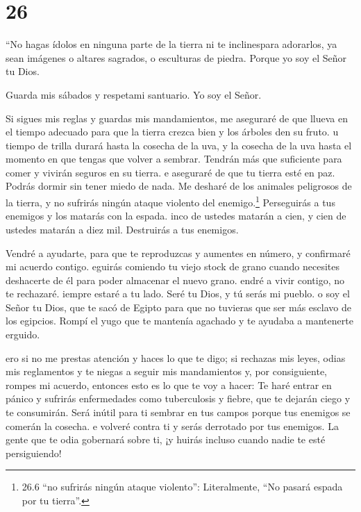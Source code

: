\hypertarget{section-25}{%
\section{26}\label{section-25}}

 ``No hagas ídolos en ninguna parte de la tierra ni te
inclinespara adorarlos, ya sean imágenes o altares sagrados, o
esculturas de piedra. Porque yo soy el Señor tu Dios.

 Guarda mis sábados y respetami santuario. Yo soy el Señor.

 Si sigues mis reglas y guardas mis mandamientos,
 me aseguraré de que llueva en el tiempo adecuado para que
la tierra crezca bien y los árboles den su fruto.  u tiempo
de trilla durará hasta la cosecha de la uva, y la cosecha de la uva
hasta el momento en que tengas que volver a sembrar. Tendrán más que
suficiente para comer y vivirán seguros en su tierra.  e
aseguraré de que tu tierra esté en paz. Podrás dormir sin tener miedo de
nada. Me desharé de los animales peligrosos de la tierra, y no sufrirás
ningún ataque violento del enemigo.\footnote{26.6 ``no sufrirás ningún
  ataque violento'': Literalmente, ``No pasará espada por tu tierra''.}
 Perseguirás a tus enemigos y los matarás con la espada.
 inco de ustedes matarán a cien, y cien de ustedes matarán a
diez mil. Destruirás a tus enemigos.

 Vendré a ayudarte, para que te reproduzcas y aumentes en
número, y confirmaré mi acuerdo contigo.  eguirás comiendo
tu viejo stock de grano cuando necesites deshacerte de él para poder
almacenar el nuevo grano.  endré a vivir contigo, no te
rechazaré.  iempre estaré a tu lado. Seré tu Dios, y tú
serás mi pueblo.  o soy el Señor tu Dios, que te sacó de
Egipto para que no tuvieras que ser más esclavo de los egipcios. Rompí
el yugo que te mantenía agachado y te ayudaba a mantenerte erguido.

 ero si no me prestas atención y haces lo que te digo;
 si rechazas mis leyes, odias mis reglamentos y te niegas a
seguir mis mandamientos y, por consiguiente, rompes mi acuerdo,
 entonces esto es lo que te voy a hacer: Te haré entrar en
pánico y sufrirás enfermedades como tuberculosis y fiebre, que te
dejarán ciego y te consumirán. Será inútil para ti sembrar en tus campos
porque tus enemigos se comerán la cosecha.  e volveré
contra ti y serás derrotado por tus enemigos. La gente que te odia
gobernará sobre ti, ¡y huirás incluso cuando nadie te esté persiguiendo!

